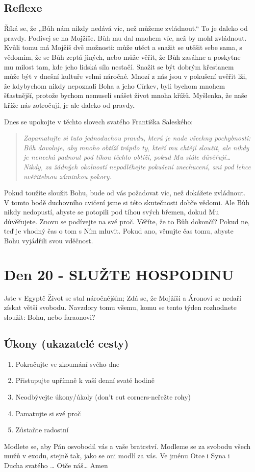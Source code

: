 \documentclass[11pt]{article}
\newcommand{\zacatekTretiTyden}{
  Jste v Egyptě \newline
  Život se stal náročnějším; Zdá se, že Mojžíši a Áronovi se nedaří získat větší svobodu. Navzdory tomu všemu,
komu se tento týden rozhodnete sloužit: Bohu, nebo faraonovi?

\subsection*{Úkony (ukazatelé cesty)}
\begin{enumerate}
  \item Pokračujte ve zkoumání svého dne
  \item Přistupujte upřímně k vaší denní svaté hodině
  \item Neodbývejte úkony/úkoly (don’t cut corners-neřežte rohy)
  \item Pamatujte si své proč
  \item Zůstaňte radostní
\end{enumerate}
Modlete se, aby Pán osvobodil vás a vaše bratrství. \newline
Modleme se za svobodu všech mužů v exodu, stejně tak, jako se oni modlí za vás.\newline
Ve jménu Otce i Syna i Ducha svatého …  Otče náš… Amen
}
\begin{document}
\subsection*{Reflexe}

Říká se, že „Bůh nám nikdy nedává víc, než můžeme zvládnout.“ To je daleko od pravdy. Podívej se na Mojžíše.
Bůh mu dal mnohem víc, než by mohl zvládnout. Kvůli tomu má Mojžíš dvě možnosti: může utéct a snažit se utěšit
sebe sama, s vědomím, že se Bůh zeptá jiných, nebo může věřit, že Bůh zasáhne a poskytne mu milost tam, kde
jeho lidská síla nestačí.
Snažit se být dobrým křesťanem může být v dnešní kultuře velmi náročné. Mnozí z nás jsou v pokušení uvěřit lži,
že kdybychom nikdy nepoznali Boha a jeho Církev, byli bychom mnohem šťastnější, protože bychom nemuseli
snášet život mnoha křížů. Myšlenka, že naše kříže nás zotročují, je ale daleko od pravdy.

\begin{minipage}{\dimexpr\textwidth-20pt}
  Dnes se upokojte v těchto slovech svatého Františka Saleského:
\begin{quote}
  \textit{Zapamatujte si tuto jednoduchou pravdu, která je nade všechny pochybnosti: Bůh dovoluje, aby mnoho obtíží trápilo ty, kteří mu chtějí sloužit, ale nikdy je nenechá padnout pod tíhou těchto obtíží, pokud Mu stále důvěřují… Nikdy, za žádných okolností nepodléhejte pokušení znechucení, ani pod lehce uvěřitelnou záminkou pokory.}
\end{quote}
\end{minipage}


Pokud toužíte sloužit Bohu, bude od vás požadovat víc, než dokážete zvládnout. V tomto bodě duchovního cvičení
jsme si této skutečnosti dobře vědomi. Ale Bůh nikdy nedopustí, abyste se potopili pod tíhou svých břemen, dokud
Mu důvěřujete. Znovu se podívejte na své proč. Věříte, že to Bůh dokončí? Pokud ne, teď je vhodný čas o tom
s Ním mluvit. Pokud ano, věnujte čas tomu, abyste Bohu vyjádřili svou vděčnost.

\newpage
\section{Den 20 - SLUŽTE HOSPODINU}
\zacatekTretiTyden
\end{document}
